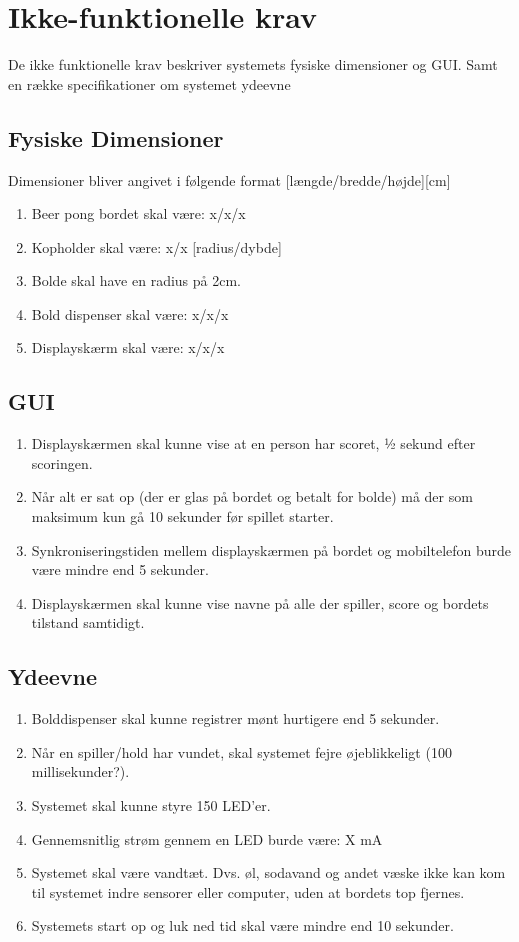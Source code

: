 \documentclass[12pt]{article}
\begin{document}
\section{Ikke-funktionelle krav}
De ikke funktionelle krav beskriver systemets fysiske dimensioner og GUI. Samt en række specifikationer om systemet ydeevne 
\subsection{Fysiske Dimensioner}
Dimensioner bliver angivet i følgende format [længde/bredde/højde][cm]
\begin{enumerate}
\item Beer pong bordet skal være: x/x/x
\item Kopholder skal være: x/x [radius/dybde]
\item Bolde skal have en radius på 2cm.
\item Bold dispenser skal være: x/x/x
\item Displayskærm skal være: x/x/x
\end{enumerate}

\subsection{GUI}
\begin{enumerate}
\item Displayskærmen skal kunne vise at en person har scoret, ½ sekund efter scoringen.
\item Når alt er sat op (der er glas på bordet og betalt for bolde) må der som maksimum kun gå 10 sekunder før spillet starter.
\item Synkroniseringstiden mellem displayskærmen på bordet og mobiltelefon burde være mindre end 5 sekunder.
\item Displayskærmen skal kunne vise navne på alle der spiller, score og bordets tilstand samtidigt.
\end{enumerate}

\subsection{Ydeevne}
\begin{enumerate}
\item Bolddispenser skal kunne registrer mønt hurtigere end 5 sekunder.
\item Når en spiller/hold har vundet, skal systemet fejre øjeblikkeligt (100 millisekunder?).
\item Systemet skal kunne styre 150 LED'er.
\item Gennemsnitlig strøm gennem en LED burde være: X mA
\item Systemet skal være vandtæt. Dvs. øl, sodavand og andet væske ikke kan kom til systemet indre sensorer eller computer, uden at bordets top fjernes.
\item Systemets start op og luk ned tid skal være mindre end 10 sekunder.
\end{enumerate}
\end{document}
